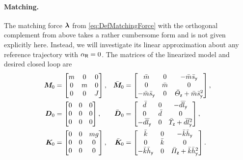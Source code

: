 
\paragraph{Matching.}
The matching force $\boldsymbol{\lambda}$ from \eqref{eq:DefMatchingForce} with the orthogonal complement from above takes a rather cumbersome form and is not given explicitly here.
Instead, we will investigate its linear approximation about any reference trajectory with $\alpha_{\mathsf{R}} = 0$.
The matrices of the linearized model and desired closed loop are
\begin{subequations}
\begin{align}
 \boldsymbol{M}_{\!\text{0}} &= \begin{bmatrix} m & 0 & 0 \\ 0 & m & 0 \\ 0 & 0 & J \end{bmatrix},&
 \bar{\boldsymbol{M}}_{\!\text{0}} &= \begin{bmatrix} \bar{m} & 0 & -\bar{m}\bar{s}_{\mathsf{y}} \\ 0 & \bar{m} & 0 \\ -\bar{m}\bar{s}_{\mathsf{y}} & 0 & \bar{\varTheta}_{\mathsf{z}} + \bar{m}\bar{s}_{\mathsf{y}}^2 \end{bmatrix},
\\
 \boldsymbol{D}_{\text{0}} &= \begin{bmatrix} 0 & 0 & 0 \\ 0 & 0 & 0 \\ 0 & 0 & 0 \end{bmatrix},&
 \bar{\boldsymbol{D}}_{\text{0}} &= \begin{bmatrix} \bar{d} & 0 & -\bar{d}\bar{l}_{\mathsf{y}} \\ 0 & \bar{d} & 0 \\ -\bar{d}\bar{l}_{\mathsf{y}} & 0 & \bar{\varUpsilon}_{\mathsf{z}} + \bar{d}\bar{l}_{\mathsf{y}}^2 \end{bmatrix},
\\
 \boldsymbol{K}_{\!\text{0}} &= \begin{bmatrix} 0 & 0 & m g \\ 0 & 0 & 0 \\ 0 & 0 & 0 \end{bmatrix},&
 \bar{\boldsymbol{K}}_{\!\text{0}} &= \begin{bmatrix} \bar{k} & 0 & -\bar{k}\bar{h}_{\mathsf{y}} \\ 0 & \bar{k} & 0 \\ -\bar{k}\bar{h}_{\mathsf{y}} & 0 & \bar{\varPi}_{\mathsf{z}} + \bar{k}\bar{h}_{\mathsf{y}}^2 \end{bmatrix}.
\end{align}
\end{subequations}
